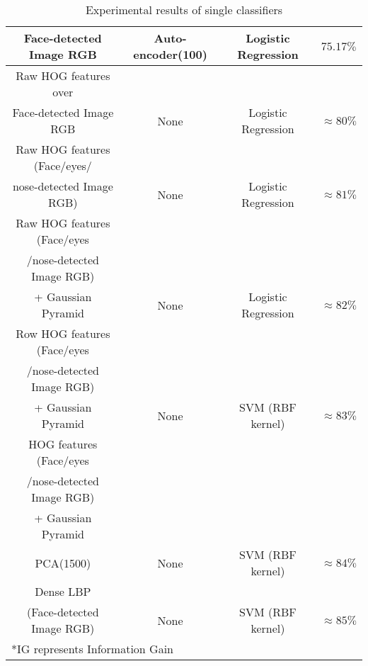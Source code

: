 \begin{table}[h!]
\begin{tabular*}{\textwidth}{c @{\extracolsep{\fill}}ccc}
Face-detected Image RGB & Auto-encoder(100) & Logistic Regression & $75.17\%$ \\ \hline
Raw HOG features over &  &  &\\
Face-detected Image RGB & None & Logistic Regression &  $\approx 80\%$  \\  \hline
Raw HOG features (Face/eyes/ & & & \\ 
nose-detected Image RGB) & None & Logistic Regression & $\approx 81\%$ \\ \hline
Raw HOG features (Face/eyes & & & \\ 
/nose-detected Image RGB) & & &\\ 
+ Gaussian Pyramid & None & Logistic Regression & $\approx 82\%$  \\ \hline
Row HOG features (Face/eyes & & &\\
/nose-detected Image RGB) & & & \\ 
+ Gaussian Pyramid & None &  SVM (RBF kernel) & $\approx 83\%$  \\ \hline
HOG features (Face/eyes & & &\\
/nose-detected Image RGB) & & & \\ 
+ Gaussian Pyramid & & &\\
PCA(1500) & None &  SVM (RBF kernel) & $\approx 84\%$  \\ \hline
Dense LBP  & & & \\
(Face-detected Image RGB) & None & SVM (RBF kernel) & $\approx 85\%$  \\ 
\hline
\multicolumn{4}{l}{*IG represents Information Gain} \\
\hline
\end{tabular*}
\caption{Experimental results of single classifiers}
\label{Table 1}
\end{table}

